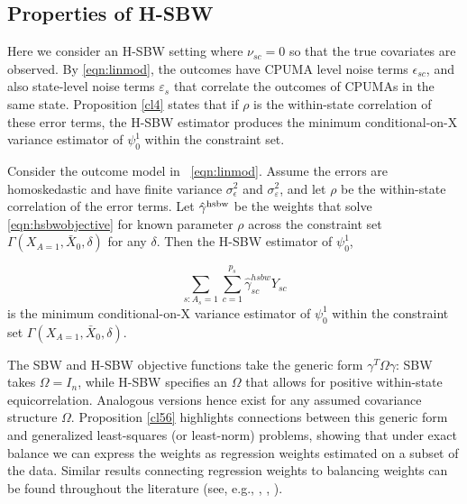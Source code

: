 \subsection{Properties of H-SBW}\label{app:AsecII}

Here we consider an H-SBW setting where $\nu_{sc}=0$ so that the true covariates are observed. By \eqref{eqn:linmod}, the outcomes have CPUMA level noise terms  $\epsilon_{sc}$, and also state-level noise terms $\varepsilon_s$ that correlate the outcomes of CPUMAs in the same state. Proposition \ref{cl4} states that if $\rho$ is the within-state correlation of these error terms, the H-SBW estimator produces the minimum conditional-on-X variance estimator of $\psi_0^1$ within the constraint set.

\begin{proposition}\label{cl4}
    Consider the outcome model in ~\eqref{eqn:linmod}. Assume the errors are homoskedastic and have finite variance $\sigma^2_{\epsilon}$ and $\sigma^2_{\varepsilon}$, and let $\rho$ be the within-state correlation of the error terms. Let $\hat{\gamma}^{\textup{hsbw}}$ be the weights that solve \eqref{eqn:hsbwobjective} for known parameter $\rho$ across the constraint set $\Gamma(X_{A=1}, \bar{X}_0, \delta)$ for any $\delta$. Then the H-SBW estimator of $\psi_0^1$,

    \[\sum_{s: A_s = 1}\sum_{c=1}^{p_s}\hat{\gamma}_{sc}^{hsbw}Y_{sc}\] 
    is the minimum conditional-on-X variance estimator of $\psi_0^1$ within the constraint set $\Gamma(X_{A=1}, \bar{X}_0, \delta)$.
\end{proposition}

The SBW and H-SBW objective functions take the generic form $\gamma^T\Omega\gamma$: SBW takes $\Omega = I_n$, while H-SBW specifies an $\Omega$ that allows for positive within-state equicorrelation. Analogous versions hence exist for any assumed covariance structure $\Omega$. Proposition \ref{cl56} highlights connections between this generic form and generalized least-squares (or least-norm) problems, showing that under exact balance we can express the weights as regression weights estimated on a subset of the data. Similar results connecting regression weights to balancing weights can be found throughout the literature (see, e.g., \cite{kline2011oaxaca}, \cite{ben2021augmented}, \cite{chattopadhyay2021implied}).

